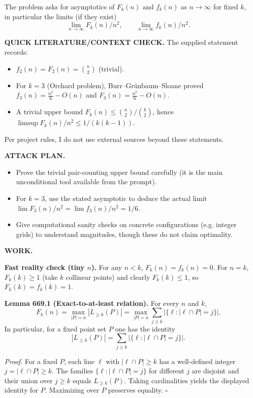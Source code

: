 The problem asks for asymptotics of $F_k(n)$ and $f_k(n)$ as $n\to\infty$ for fixed $k$, in particular the limits (if they exist)
\[\lim_{n\to\infty} F_k(n)/n^2,\qquad \lim_{n\to\infty} f_k(n)/n^2.\]

\bigskip
\noindent\textbf{QUICK LITERATURE/CONTEXT CHECK.}
The supplied statement records:
\begin{itemize}
\item $f_2(n)=F_2(n)=\binom n2$ (trivial).
\item For $k=3$ (Orchard problem), Burr--Gr\"{u}nbaum--Sloane proved $f_3(n)=\frac{n^2}{6}-O(n)$ and $F_3(n)=\frac{n^2}{6}-O(n)$.
\item A trivial upper bound $F_k(n)\le \binom n2/\binom k2$, hence $\limsup F_k(n)/n^2\le 1/(k(k-1))$.
\end{itemize}
Per project rules, I do not use external sources beyond these statements.

\bigskip
\noindent\textbf{ATTACK PLAN.}
\begin{itemize}
\item Prove the trivial pair-counting upper bound carefully (it is the main unconditional tool available from the prompt).
\item For $k=3$, use the stated asymptotic to deduce the actual limit $\lim F_3(n)/n^2=\lim f_3(n)/n^2=1/6$.
\item Give computational sanity checks on concrete configurations (e.g. integer grids) to understand magnitudes, though these do not claim optimality.
\end{itemize}

\bigskip
\noindent\textbf{WORK.}

\medskip
\noindent\textbf{Fast reality check (tiny $n$).}
For any $n<k$, $F_k(n)=f_k(n)=0$.
For $n=k$, $F_k(k)\ge 1$ (take $k$ collinear points) and clearly $F_k(k)\le 1$, so $F_k(k)=f_k(k)=1$.

\medskip
\noindent\textbf{Lemma 669.1 (Exact-to-at-least relation).}
For every $n$ and $k$,
\[
F_k(n) = \max_{|P|=n} |L_{\ge k}(P)| = \max_{|P|=n} \sum_{j\ge k} |\{\ell: |\ell\cap P|=j\}|.
\]
In particular, for a fixed point set $P$ one has the identity
\[
|L_{\ge k}(P)| = \sum_{j\ge k} |\{\ell: |\ell\cap P|=j\}|.
\]

\noindent\emph{Proof.}
For a fixed $P$, each line $\ell$ with $|\ell\cap P|\ge k$ has a well-defined integer $j=|\ell\cap P|\ge k$.
The families $\{\ell:|\ell\cap P|=j\}$ for different $j$ are disjoint and their union over $j\ge k$ equals $L_{\ge k}(P)$.
Taking cardinalities yields the displayed identity for $P$.
Maximizing over $P$ preserves equality.
\hfill$\square$

